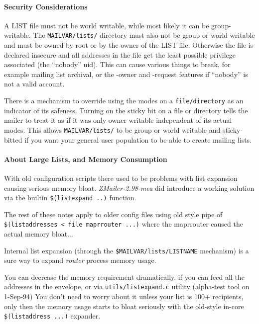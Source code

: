 \paragraph{Security Considerations}



A LIST file must not be world writable, while most likely it can be
group-writable.  The {\tt MAILVAR/lists/} directory must also not be group
or world writable and must be owned by root or by the owner of the
LIST file.  Otherwise the file is declared insecure and all addresses
in the file get the least possible privilege associated (the ``nobody''
uid).  This can cause various things to break, for example mailing
list archival, or the -owner and -request features if ``nobody'' is
not a valid account.

There is a mechanism to override using the modes on a {\tt file/directory}
as an indicator of its safeness.  Turning on the sticky bit on a file
or directory tells the mailer to treat it as if it was only owner
writable independent of its actual modes.  This allows {\tt MAILVAR/lists/}
to be group or world writable and sticky-bitted if you want your general
user population to be able to create mailing lists.




\paragraph{About Large Lists, and Memory Consumption}



With old configuration scripts there used to be problems with list
expansion causing serious memory bloat.  {\em ZMailer-2.98-mea\/} did introduce
a working solution via the builtin  {\tt \$(listexpand ..)} function.

The rest of these notes apply to older config files using old style pipe
of {\tt \$(listaddresses  < file {\verbar} maprrouter ...)}  where the  
maprrouter caused the actual memory bloat...

Internal list expansion (through the  {\tt \$MAILVAR/lists/LISTNAME} 
mechanism) is a sure way to expand {\em router\/} process memory usage.

You can decrease the memory requirement dramatically, if you can
feed all the addresses in the envelope, or via {\tt utils/listexpand.c}
utility (alpha-test tool on 1-Sep-94) You don't need to worry about 
it unless your list is 100+ recipients, only then the memory usage starts 
to bloat seriously with the old-style in-core {\tt \$(listaddress ...)} 
expander.

